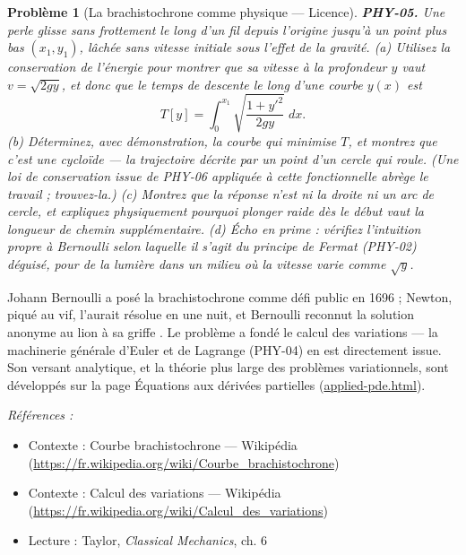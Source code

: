 \documentclass[11pt]{article}
\newtheorem{problem}{Problème}
\newenvironment{refs}{\par\small\noindent\emph{Références :}\begin{itemize}\setlength\itemsep{0pt}}{\end{itemize}\normalsize}
\begin{document}
\bigskip

\begin{problem}[{La brachistochrone comme physique --- Licence}]
\textbf{PHY-05.} Une perle glisse sans frottement le long d'un fil depuis
l'origine jusqu'à un point plus bas $(x_1, y_1)$, lâchée sans vitesse initiale sous l'effet de
la gravité. (a) Utilisez la conservation de l'énergie pour montrer que sa vitesse à la profondeur
$y$ vaut $v = \sqrt{2gy}$, et donc que le temps de descente le long d'une courbe $y(x)$
est
\[ T[y] = \int_0^{x_1} \sqrt{\frac{1 + y'^2}{2gy}}\;dx. \]
(b) Déterminez, avec démonstration, la courbe qui minimise $T$, et montrez que c'est une
cycloïde --- la trajectoire décrite par un point d'un cercle qui roule. (Une loi de conservation
issue de PHY-06 appliquée à cette fonctionnelle abrège le travail ; trouvez-la.) (c) Montrez que
la réponse n'est ni la droite ni un arc de cercle, et expliquez physiquement pourquoi plonger
raide dès le début vaut la longueur de chemin supplémentaire. (d) Écho en prime : vérifiez
l'intuition propre à Bernoulli selon laquelle il s'agit du principe de Fermat (PHY-02) déguisé,
pour de la lumière dans un milieu où la vitesse varie comme $\sqrt{y}$.
\end{problem}

\noindent Johann Bernoulli a posé la brachistochrone comme défi public en 1696 ;
Newton, piqué au vif, l'aurait résolue en une nuit, et Bernoulli reconnut la solution anonyme
\og{} au lion à sa griffe \fg{}. Le problème a fondé le calcul des variations --- la machinerie générale
d'Euler et de Lagrange (PHY-04) en est directement issue. Son versant analytique, et la théorie
plus large des problèmes variationnels, sont développés sur la page
Équations aux dérivées partielles (\url{applied-pde.html}).

\begin{refs}
\item Contexte : Courbe brachistochrone --- Wikipédia (\url{https://fr.wikipedia.org/wiki/Courbe_brachistochrone})
\item Contexte : Calcul des variations --- Wikipédia (\url{https://fr.wikipedia.org/wiki/Calcul_des_variations})
\item Lecture : Taylor, \textit{Classical Mechanics}, ch. 6
\end{refs}

\bigskip
\end{document}
